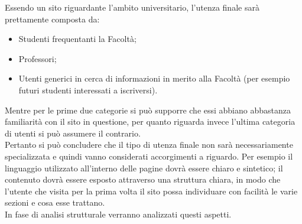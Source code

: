 Essendo un sito riguardante l'ambito universitario, l'utenza finale sarà prettamente composta da:
	\begin{itemize}
		\item Studenti frequentanti la Facoltà;
		\item Professori;
		\item Utenti generici in cerca di informazioni in merito alla Facoltà (per esempio futuri studenti interessati a iscriversi).
	\end{itemize}
Mentre per le prime due categorie si può supporre che essi abbiano abbastanza familiarità con il sito in questione, per quanto riguarda invece l'ultima categoria di utenti si può assumere il contrario. \\
Pertanto si può concludere che il tipo di utenza finale non sarà necessariamente specializzata e quindi vanno considerati accorgimenti a riguardo. Per esempio il linguaggio utilizzato all'interno delle pagine dovrà essere chiaro e sintetico; il contenuto dovrà essere esposto attraverso una struttura chiara, in modo che l'utente che visita per la prima volta il sito possa individuare con facilità le varie sezioni e cosa esse trattano. \\
In fase di analisi strutturale verranno analizzati questi aspetti.